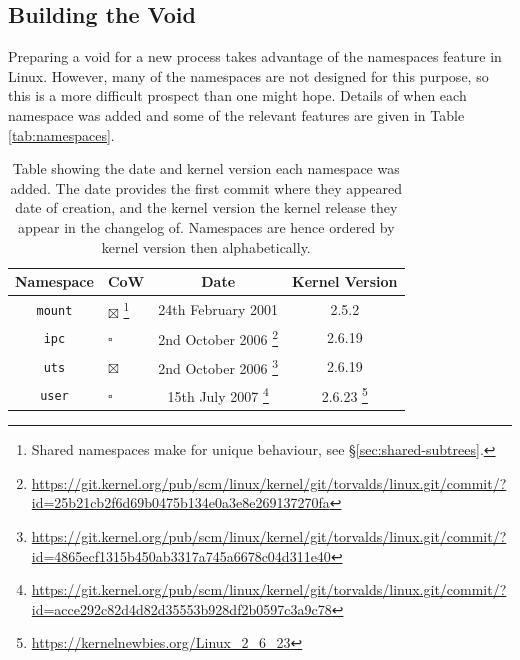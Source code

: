 \documentclass[sigplan]{acmart}
\begin{document}
\subsection{Building the Void}

Preparing a void for a new process takes advantage of the namespaces feature in Linux. However, many of the namespaces are not designed for this purpose, so this is a more difficult prospect than one might hope. Details of when each namespace was added and some of the relevant features are given in Table \ref{tab:namespaces}.

\begin{table}
    \caption{Table showing the date and kernel version each namespace was added. The date provides the first commit where they appeared date of creation, and the kernel version the kernel release they appear in the changelog of. Namespaces are hence ordered by kernel version then alphabetically.}

    \begin{minipage}{\textwidth}
    \begin{center}
    \begin{tabular}{c|l|c|c}
        Namespace & CoW & Date & Kernel Version \\ \hline

        \texttt{mount}
            & $\boxtimes$ \footnote{Shared namespaces make for unique behaviour, see §\ref{sec:shared-subtrees}.}
            & 24th February 2001 \citep{viro_patchcft_2001}
            & 2.5.2 \citep{torvalds_linux_2002} \\
            
        \texttt{ipc}
            & $\square$
            & 2nd October 2006 \footnote{\url{https://git.kernel.org/pub/scm/linux/kernel/git/torvalds/linux.git/commit/?id=25b21cb2f6d69b0475b134e0a3e8e269137270fa}}
            & 2.6.19 \citep{noauthor_linux_2006} \\

        \texttt{uts}
            & $\boxtimes$
            & 2nd October 2006 \footnote{\url{https://git.kernel.org/pub/scm/linux/kernel/git/torvalds/linux.git/commit/?id=4865ecf1315b450ab3317a745a6678c04d311e40}}
            & 2.6.19 \citep{noauthor_linux_2006} \\
            
        \texttt{user}
            & $\square$
            & 15th July 2007 \footnote{\url{https://git.kernel.org/pub/scm/linux/kernel/git/torvalds/linux.git/commit/?id=acce292c82d4d82d35553b928df2b0597c3a9c78}}
            & 2.6.23 \footnote{\url{https://kernelnewbies.org/Linux_2_6_23}} \\
            

\end{tabular}
\end{center}
\end{minipage}
\end{table}
\end{document}
